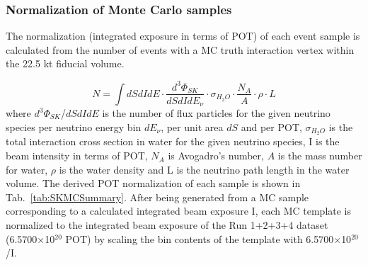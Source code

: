 \subsubsection {Normalization of Monte Carlo samples}
\label{sec:mc_templates:normalization}

The normalization (integrated exposure in terms of POT) of each event sample is calculated from
the number of events with a MC truth interaction vertex within the 22.5 kt fiducial volume.

\begin{equation}
\displaystyle
  N = \int  dS dI dE \cdot
            \frac{d^{3}\Phi_{SK}}{dS dI dE_{\nu}} \cdot
            \sigma_{H_{2}O} \cdot
            \frac{N_{A}}{A} \cdot \rho \cdot L 
\end{equation}
where 
$d^{3}\Phi_{SK}$/$dS dI dE$ is the number of flux particles for the given neutrino species 
per neutrino energy bin $dE_{\nu}$, per unit area $dS$ and per POT,
$\sigma_{H_{2}O}$ is the total interaction cross section in water
for the given neutrino species,
I is the beam intensity in terms of POT,
$N_{A}$ is  Avogadro's number,
$A$ is the mass number for water,
$\rho$ is the water density
and L is the neutrino path length in the water volume.
The derived POT normalization of each sample is shown in Tab.\ \ref{tab:SKMCSummary}.
After being generated from a MC sample corresponding to a calculated integrated beam exposure I,
each MC template is normalized to the integrated beam exposure of the Run 1+2+3+4 dataset (6.5700$\times$10$^{20}$ POT)
by scaling the bin contents of the template with 6.5700$\times$10$^{20}$/I.

